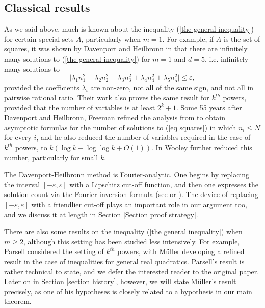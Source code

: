 \documentclass[12pt,a4paper,twoside,reqno]{amsart}
\numberwithin{equation}{section}
\begin{document}
\subsection{Classical results}
\label{Section Classical results}
As we said above, much is known about the inequality (\ref{the general inequality}) for certain special sets $A$, particularly when $m=1$. For example, if $A$ is the set of squares, it was shown by Davenport and Heilbronn in \cite{DaHe46} that there are infinitely many solutions to (\ref{the general inequality}) for $m=1$ and $d=5$, i.e. infinitely many solutions to 
\begin{equation}
\label{eq squares}
\vert \lambda_1 n_1^2 + \lambda_2 n_2^2 + \lambda_3 n_3^2 + \lambda_4 n_4^2 + \lambda_5 n_5^2 \vert \leqslant \varepsilon,
\end{equation} provided the coefficients $\lambda_i$ are non-zero, not all of the same sign, and not all in pairwise rational ratio. Their work also proves the same result for $k^{th}$ powers, provided that the number of variables is at least $2^k + 1$. Some 55 years after Davenport and Heilbronn, Freeman \cite{Fr02} refined the analysis from \cite{DaHe46} to obtain asymptotic formulas for the number of solutions to (\ref{eq squares}) in which $n_i\leqslant N$ for every $i$, and he also reduced the number of variables required in the case of $k^{th}$ powers, to $k(\log k + \log\log k + O(1))$. In \cite{Wo03} Wooley further reduced this number, particularly for small $k$. 

The Davenport-Heilbronn method is Fourier-analytic. One begins by replacing the interval $[-\varepsilon,\varepsilon]$ with a Lipschitz cut-off function, and then one expresses the solution count via the Fourier inversion formula (see \cite[Chapter 20]{Da05} or \cite[Chapter 11]{Va97}). The device of replacing $[-\varepsilon,\varepsilon]$ with a friendlier cut-off plays an important role in our argument too, and we discuss it at length in Section \ref{Section proof strategy}.

There are also some results on the inequality (\ref{the general inequality}) when $m\geqslant 2$, although this setting has been studied less intensively. For example, Parsell \cite{Parsell02} considered the setting of $k^{th}$ powers, with  M\"{u}ller \cite{Mu05} developing a refined result in the case of inequalities for general real quadratics. Parsell's result is rather technical to state, and we defer the interested reader to the original paper. Later on in Section \ref{section history}, however, we will state M\"{u}ller's result precisely, as one of his hypotheses is closely related to a hypothesis in our main theorem. \\
\end{document}
